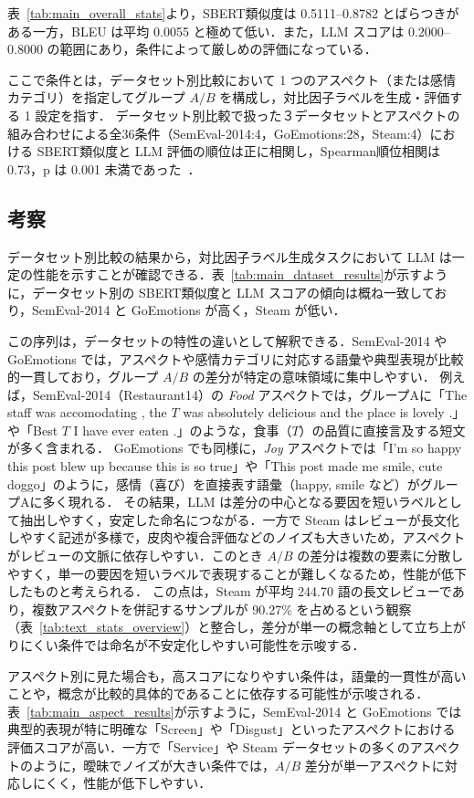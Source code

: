 表~\ref{tab:main_overall_stats}より，SBERT類似度は 0.5111--0.8782 とばらつきがある一方，BLEU は平均 0.0055 と極めて低い．また，LLM スコアは 0.2000--0.8000 の範囲にあり，条件によって厳しめの評価になっている．

ここで条件とは，データセット別比較において 1 つのアスペクト（または感情カテゴリ）を指定してグループ $A/B$ を構成し，対比因子ラベルを生成・評価する 1 設定を指す．
データセット別比較で扱った３データセットとアスペクトの組み合わせによる全36条件（SemEval-2014:4，GoEmotions:28，Steam:4）における SBERT類似度と LLM 評価の順位は正に相関し，Spearman順位相関は 0.73，p は 0.001 未満であった~\cite{spearman1904association}．

\subsection{考察}
\label{subsec:main_experiment_discussion}
データセット別比較の結果から，対比因子ラベル生成タスクにおいて LLM は一定の性能を示すことが確認できる．表~\ref{tab:main_dataset_results}が示すように，データセット別の SBERT類似度と LLM スコアの傾向は概ね一致しており，SemEval-2014 と GoEmotions が高く，Steam が低い．

この序列は，データセットの特性の違いとして解釈できる．SemEval-2014 や GoEmotions では，アスペクトや感情カテゴリに対応する語彙や典型表現が比較的一貫しており，グループ $A/B$ の差分が特定の意味領域に集中しやすい．
例えば，SemEval-2014（Restaurant14）の \textit{Food} アスペクトでは，グループAに「The staff was accomodating , the $T$ was absolutely delicious and the place is lovely .」や「Best $T$ I have ever eaten .」のような，食事（$T$）の品質に直接言及する短文が多く含まれる．
GoEmotions でも同様に，\textit{Joy} アスペクトでは「I'm so happy this post blew up because this is so true」や「This post made me smile, cute doggo」のように，感情（喜び）を直接表す語彙（happy, smile など）がグループAに多く現れる．
その結果，LLM は差分の中心となる要因を短いラベルとして抽出しやすく，安定した命名につながる．一方で Steam はレビューが長文化しやすく記述が多様で，皮肉や複合評価などのノイズも大きいため，アスペクトがレビューの文脈に依存しやすい．このとき $A/B$ の差分は複数の要素に分散しやすく，単一の要因を短いラベルで表現することが難しくなるため，性能が低下したものと考えられる．
この点は，Steam が平均 244.70 語の長文レビューであり，複数アスペクトを併記するサンプルが 90.27\% を占めるという観察（表~\ref{tab:text_stats_overview}）と整合し，差分が単一の概念軸として立ち上がりにくい条件では命名が不安定化しやすい可能性を示唆する．

アスペクト別に見た場合も，高スコアになりやすい条件は，語彙的一貫性が高いことや，概念が比較的具体的であることに依存する可能性が示唆される．表~\ref{tab:main_aspect_results}が示すように，SemEval-2014 と GoEmotions では典型的表現が特に明確な「Screen」や「Disgust」といったアスペクトにおける評価スコアが高い．一方で「Service」や Steam データセットの多くのアスペクトのように，曖昧でノイズが大きい条件では，$A/B$ 差分が単一アスペクトに対応しにくく，性能が低下しやすい．

